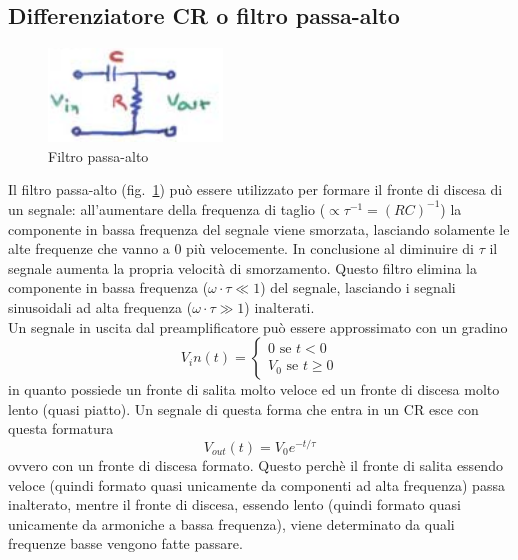 \subsection{Differenziatore CR o filtro passa-alto}
\begin{figure}[htbp]
\begin{center}
\includegraphics[scale=1]{./Immagini/FiltroCR.png}
\caption{Filtro passa-alto}
\label{fig:filtroCR}
\end{center}
\end{figure}
Il filtro passa-alto (fig.~\ref{fig:filtroCR}) pu\`o essere utilizzato per formare il fronte di discesa di un segnale:
all'aumentare della frequenza di taglio ($\propto \tau^{-1}=(RC)^{-1}$) la componente in bassa frequenza del segnale viene smorzata, lasciando solamente le alte frequenze che vanno a 0 pi\`u velocemente.
In conclusione al diminuire di $\tau$ il segnale aumenta la propria velocit\`a di smorzamento.
Questo filtro elimina la componente in bassa frequenza ($\omega \cdot \tau \ll 1$) del segnale, lasciando i segnali sinusoidali ad alta frequenza ($\omega \cdot \tau \gg 1$) inalterati.\\
Un segnale in uscita dal preamplificatore pu\`o essere approssimato con un gradino
\begin{equation*}
V_in(t) = \begin{cases}
0 \text{ se }t<0\\
V_0 \text{ se }t\ge 0
\end{cases}
\end{equation*}
in quanto possiede un fronte di salita molto veloce ed un fronte di discesa molto lento (quasi piatto).
Un segnale di questa forma che entra in un CR esce con questa formatura
\begin{equation*}
V_{out}(t) = V_0 e^{-t/\tau} 
\end{equation*}
ovvero con un fronte di discesa formato. 
Questo perch\`e il fronte di salita essendo veloce (quindi formato quasi unicamente da componenti ad alta frequenza) passa inalterato, mentre il fronte di discesa,
essendo lento (quindi formato quasi unicamente da armoniche a bassa frequenza), viene determinato da quali frequenze basse vengono fatte passare.
